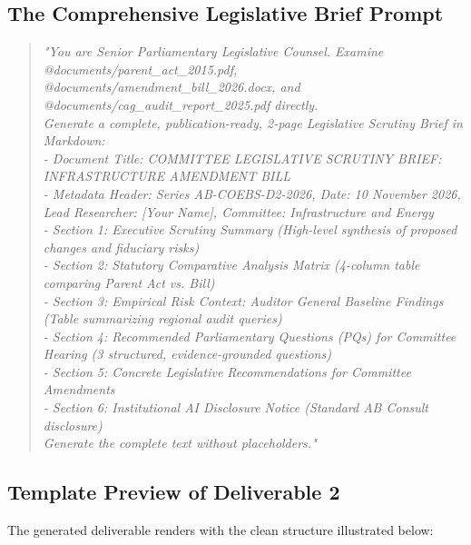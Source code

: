 \documentclass[11pt, a4paper]{report}
\begin{document}
\subsection{The Comprehensive Legislative Brief Prompt}
\begin{quote}
\small
\textit{"You are Senior Parliamentary Legislative Counsel. Examine @documents/parent\_act\_2015.pdf, @documents/amendment\_bill\_2026.docx, and @documents/cag\_audit\_report\_2025.pdf directly. \\
Generate a complete, publication-ready, 2-page Legislative Scrutiny Brief in Markdown: \\
- Document Title: COMMITTEE LEGISLATIVE SCRUTINY BRIEF: INFRASTRUCTURE AMENDMENT BILL \\
- Metadata Header: Series AB-COEBS-D2-2026, Date: 10 November 2026, Lead Researcher: [Your Name], Committee: Infrastructure and Energy \\
- Section 1: Executive Scrutiny Summary (High-level synthesis of proposed changes and fiduciary risks) \\
- Section 2: Statutory Comparative Analysis Matrix (4-column table comparing Parent Act vs. Bill) \\
- Section 3: Empirical Risk Context: Auditor General Baseline Findings (Table summarizing regional audit queries) \\
- Section 4: Recommended Parliamentary Questions (PQs) for Committee Hearing (3 structured, evidence-grounded questions) \\
- Section 5: Concrete Legislative Recommendations for Committee Amendments \\
- Section 6: Institutional AI Disclosure Notice (Standard AB Consult disclosure) \\
Generate the complete text without placeholders."}
\end{quote}

\subsection{Template Preview of Deliverable 2}
The generated deliverable renders with the clean structure illustrated below:
\end{document}
